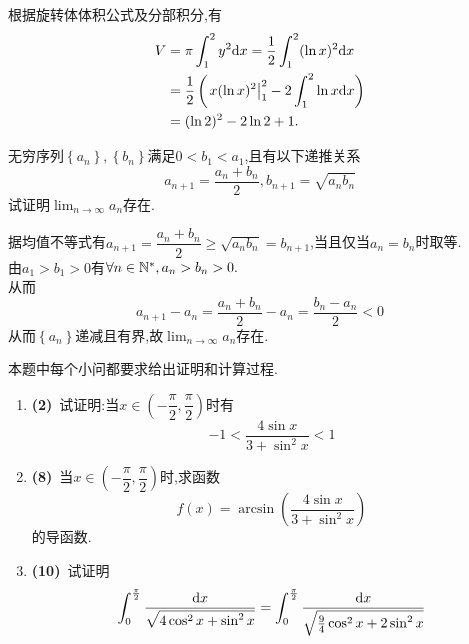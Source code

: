 \documentclass{ctexart}
\begin{document}
\begin{solution}
根据旋转体体积公式及分部积分,有
    \[\begin{aligned}
        V&=\pi\int_1^2y^2\mathrm{d} x=\dfrac12\int_1^2(\ln x)^2\mathrm{d} x\\
         &=\dfrac12\left(\left.x(\ln x)^2\right|_1^2-2\int_1^2\ln x\mathrm{d} x\right)\\
         &=(\ln2)^2-2\ln2+1.
    \end{aligned}\]
\end{solution}
\begin{problem}[7.(10\songti{分})]
    无穷序列$\left\{a_n\right\},\left\{b_n\right\}$满足$0<b_1<a_1$,且有以下递推关系$$a_{n+1}=\dfrac{a_n+b_n}{2},b_{n+1}=\sqrt{a_nb_n}$$试证明$\displaystyle\lim_{n\to\infty}{a_n}$存在.
\end{problem}
\begin{solution}
    据均值不等式有$a_{n+1}=\dfrac{a_n+b_n}{2}\geqslant\sqrt{a_nb_n}=b_{n+1}$,当且仅当$a_n=b_n$时取等.\\
    由$a_1>b_1>0$有$\forall n\in\mathbb{N}^*,a_n>b_n>0.$\\
    从而$$a_{n+1}-a_n=\dfrac{a_n+b_n}{2}-a_n=\dfrac{b_n-a_n}{2}<0$$
    从而$\left\{a_n\right\}$递减且有界,故$\displaystyle\lim_{n\to\infty}{a_n}$存在.
\end{solution}
\begin{problem}[8.(20\songti{分})]
    本题中每个小问都要求给出证明和计算过程.
        \begin{enumerate}[label=\textbf{(\arabic*)}]
            \item \textbf{(2)}\ 试证明:当$x\in\left(-\dfrac{\pi}{2},\dfrac{\pi}{2}\right)$时有$$-1<\dfrac{4\sin{x}}{3+\sin^2{x}}<1$$
            \item \textbf{(8)}\ 当$x\in\left(-\dfrac{\pi}{2},\dfrac{\pi}{2}\right)$时,求函数$$f(x)=\arcsin{\left(\dfrac{4\sin{x}}{3+\sin^2{x}}\right)}$$的导函数.
            \item \textbf{(10)}\ 试证明$$\int_{0}^{\frac{\pi}{2}}{\dfrac{\mathrm{d} x}{\sqrt{4\cos^2{x}+\sin^2{x}}}}=\int_{0}^{\frac{\pi}{2}}{\dfrac{\mathrm{d} x}{\sqrt{\frac{9}{4}\cos^2{x}+2\sin^2{x}}}}$$
        \end{enumerate}
\end{problem}
\end{document}
